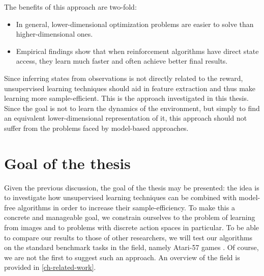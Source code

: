 The benefits of this approach are two-fold:
 \begin{itemize}
    \item In general, lower-dimensional optimization 
			problems are easier to solve than higher-dimensional ones.
    \item Empirical findings show that when reinforcement algorithms have direct state access, 
			they learn much faster and often achieve better final results.
\end{itemize}
Since inferring states from observations is not directly related to the reward,
unsupervised learning techniques should aid in 
feature extraction and thus make learning more sample-efficient.
This is the approach investigated in this thesis.
Since the goal is not to learn the dynamics of the environment,
but simply to find an equivalent lower-dimensional representation of it,
this approach should not suffer from the problems faced
by model-based approaches.


\section{Goal of the thesis}
\label{sec-thesis-goal}
Given the previous discussion, the goal of the thesis may be presented:
the idea is to investigate how unsupervised learning techniques can be combined
with model-free algorithms in order to increase their sample-efficiency.
To make this a concrete and manageable goal,
we constrain ourselves to the problem of learning from images and to problems
with discrete action spaces in particular.
To be able to compare our results to those of other researchers,
we will test our algorithms on the standard benchmark tasks in the field,
namely Atari-57 games \cite{bellemare2013arcade}.
Of course, we are not the first to suggest such an approach.
An overview of the field is provided in \ref{ch-related-work}.

